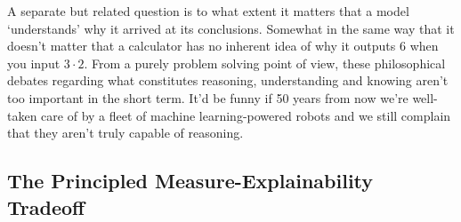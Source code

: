 \documentclass[11pt]{article}
\begin{document}
\begin{appendices}
A separate but related question is to what extent it matters that a model `understands' why it arrived at its conclusions. Somewhat in the same way that it doesn't matter that a calculator has no inherent idea of why it outputs 6 when you input $3\cdot2$. From a purely problem solving point of view, these philosophical debates regarding what constitutes reasoning, understanding and knowing aren't too important in the short term. It'd be funny if 50 years from now we're well-taken care of by a fleet of machine learning-powered robots and we still complain that they aren't truly capable of reasoning.

\subsection{The Principled Measure-Explainability Tradeoff}
\TODO{}

\end{appendices}
\end{document}
